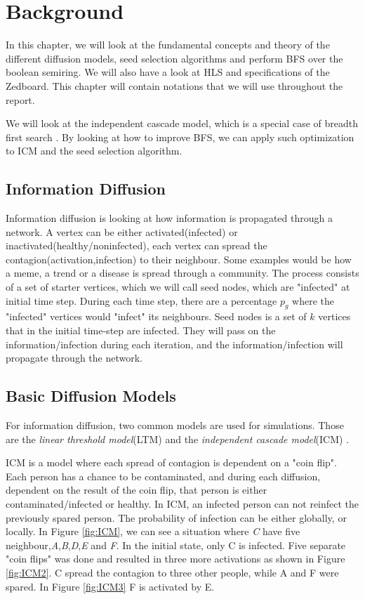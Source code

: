 \chapter{Background} \label{background}

In this chapter, we will look at the fundamental concepts and theory of the different diffusion models, seed selection algorithms and perform BFS over the boolean semiring. We will also have a look at HLS and specifications of the Zedboard. This chapter will contain notations that we will use throughout the report.

 We will look at the independent cascade model, which is a special case of breadth first search  \cite{HybridBFS2015}. By looking at how to improve BFS, we can apply such optimization to ICM and the seed selection algorithm.
 \\
 

\section{Information Diffusion}
Information diffusion is looking at how information is propagated through a network. A vertex can be either activated(infected) or inactivated(healthy/noninfected), each vertex can spread the contagion(activation,infection) to their neighbour. Some examples would be how a meme, a trend or a disease is spread through a community. The process consists of a set of starter vertices, which we will call seed nodes, which are "infected" at initial time step. During each time step, there are a percentage $p_g$ where the "infected" vertices would "infect" its neighbours. Seed nodes is a set of $k$ vertices that in the initial time-step are infected. They will pass on the information/infection during each iteration, and the information/infection will propagate through the network. 

 
\section{Basic Diffusion Models}
For information diffusion, two common models are used for simulations. Those are the \textit{linear threshold model}(LTM) and the \textit{independent cascade model}(ICM) \cite{MaximizeSpread2003}.

ICM is a model where each spread of contagion is dependent on a "coin flip". Each person has a chance to be contaminated, and during each diffusion, dependent on the result of the coin flip, that person is either contaminated/infected or healthy. In ICM, an infected person can not reinfect the previously spared person. The probability of infection can be either globally, or locally. In Figure \ref{fig:ICM}, we can see a situation where \textit{C} have five neighbour,\textit{A},\textit{B},\textit{D},\textit{E} and \textit{F}. In the initial state, only C is infected. Five separate "coin flips" was done and resulted in three more activations as shown in Figure \ref{fig:ICM2}. C spread the contagion to three other people, while A and F were spared. In Figure \ref{fig:ICM3} F is activated by E. 

